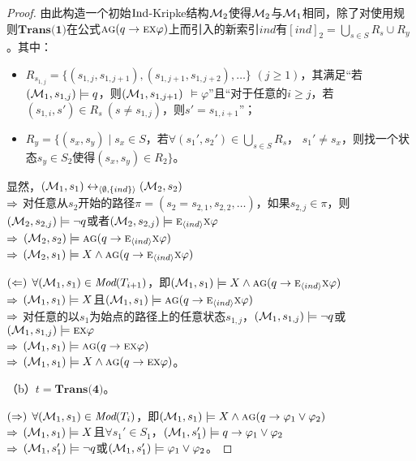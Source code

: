 \begin{proof}
	由此构造一个初始$\textrm{Ind}$-Kripke结构${\cal M}_2$使得${\cal M}_2$与${\cal M}_1$相同，除了对使用规则$\textbf{Trans(1)}$在公式$\textsc{a}\textsc{g}(q \rightarrow \textsc{e} \textsc{x} \varphi)$上而引入的新索引$ind$有$[ind]_2=\bigcup_{s\in S} R_s \cup R_y$。其中：
	\begin{itemize}
		\item $R_{s_{1,j}}=\{(s_{1,j}, s_{1,j+1}), (s_{1,j+1}, s_{1,j+2}),\dots\}$ $(j\geq 1)$，其满足“若$({\cal M}_1,s_{1,j}) \models q$，则$({\cal M}_1,s_{1,j+1})$ $\models \varphi$”且“对于任意的$i\geq j$，若$(s_{1,i}, s') \in R_s\ (s \not= s_{1,j})$，则$s'=s_{1,i+1}$”；
		\item $R_y=\{(s_x,s_y)\mid s_x\in S$，若$\forall(s_1',s_2') \in \bigcup_{s\in S} R_s$， $s_1'\not= s_x$，则找一个状态$s_y\in S_2$使得$(s_x,s_y)\in R_2\}$。
	\end{itemize}
	
	显然，$({\cal M}_1,s_1) \leftrightarrow_{{\langle{\emptyset,\{ind\}}\rangle}} ({\cal M}_2,s_2)$\\
	$\Rightarrow$ 对任意从$s_2$开始的路径$\pi=( s_2= s_{2,1} , s_{2,2}, \dots)$，如果$s_{2,j} \in \pi$，则$({\cal M}_2,s_{2,j}) \models \neg q$或者$({\cal M}_2,s_{2,j}) \models \textsc{e}_{{\langle{ind}\rangle}} \textsc{x} \varphi$\\
	$\Rightarrow$ $({\cal M}_2,s_2)\models \textsc{a}\textsc{g}(q \rightarrow \textsc{e}_{{\langle{ind}\rangle}} \textsc{x} \varphi)$\\
	$\Rightarrow$ $({\cal M}_2,s_1) \models X \wedge \textsc{a}\textsc{g}(q \rightarrow \textsc{e}_{{\langle{ind}\rangle}} \textsc{x} \varphi)$
	
	$(\Leftarrow)$ $\forall ({\cal M}_1,s_1) \in \textit{Mod}(T_{i+1})$，即$({\cal M}_1,s_1) \models X \wedge \textsc{a} \textsc{g}(q \rightarrow \textsc{e}_{{\langle{ind}\rangle}} \textsc{x} \varphi )$\\
	$\Rightarrow$ $({\cal M}_1,s_1) \models X$且$({\cal M}_1,s_1) \models \textsc{a} \textsc{g}(q \rightarrow \textsc{e}_{{\langle{ind}\rangle}} \textsc{x} \varphi)$\\
	$\Rightarrow$ 对任意的以$s_1$为始点的路径上的任意状态$s_{1,j}$，$({\cal M}_1,s_{1,j}) \models \neg q$或$({\cal M}_1,s_{1,j}) \models \textsc{e}\textsc{x}\varphi$\\
	$\Rightarrow$ $({\cal M}_1,s_1) \models \textsc{a}\textsc{g}(q \rightarrow \textsc{e} \textsc{x} \varphi)$\\
	$\Rightarrow$ $({\cal M}_1,s_1) \models X \wedge \textsc{a}\textsc{g}(q \rightarrow \textsc{e} \textsc{x} \varphi)$。
	
	（b）$t=\textbf{Trans(4)}$。
	
	$(\Rightarrow)$	$\forall({\cal M}_1,s_1) \in \textit{Mod}(T_i)$，即$({\cal M}_1,s_1) \models X \wedge \textsc{a}\textsc{g} (q \rightarrow \varphi_1 \vee \varphi_2)$ \\
	$\Rightarrow$ $({\cal M}_1,s_1) \models X$且$\forall s_1'\in S_1$，$({\cal M}_1, s_1') \models q \rightarrow \varphi_1 \vee \varphi_2$\\
	$\Rightarrow$ $({\cal M}_1,s_1')\models \neg q$或$({\cal M}_1,s_1')\models \varphi_1 \vee \varphi_2$。
	

\end{proof}

